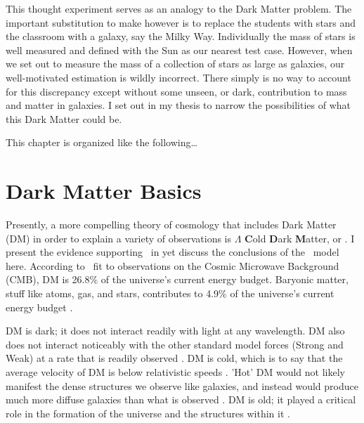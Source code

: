 This thought experiment serves as an analogy to the Dark Matter problem.
The important substitution to make however is to replace the students with stars and the classroom with a galaxy, say the Milky Way.
Individually the mass of stars is well measured and defined with the Sun as our nearest test case.
However, when we set out to measure the mass of a collection of stars as large as galaxies, our well-motivated estimation is wildly incorrect.
There simply is no way to account for this discrepancy except without some unseen, or dark, contribution to mass and matter in galaxies.
I set out in my thesis to narrow the possibilities of what this Dark Matter could be.

This chapter is organized like the following\dots
{}

\section{Dark Matter Basics\label{sec:basicDM}}

Presently, a more compelling theory of cosmology that includes Dark Matter (DM) in order to explain a variety of observations is $\Lambda$ \textbf{C}old \textbf{D}ark \textbf{M}atter, or \lcdm.
I present the evidence supporting \lcdm~in  yet discuss the conclusions of the \lcdm~model here.
According to \lcdm~fit to observations on the Cosmic Microwave Background (CMB), DM is 26.8\% of the universe's current energy budget.
Baryonic matter, stuff like atoms, gas, and stars, contributes to 4.9\% of the universe's current energy budget \cite{Greene:cosmology_dm,Young:cosmology_dm,Bertone:particleDM}.


DM is dark; it does not interact readily with light at any wavelength.
DM also does not interact noticeably with the other standard model forces (Strong and Weak) at a rate that is readily observed \cite{Bertone:particleDM}.
DM is cold, which is to say that the average velocity of DM is below relativistic speeds \cite{Greene:cosmology_dm}.
'Hot' DM would not likely manifest the dense structures we observe like galaxies, and instead would produce much more diffuse galaxies than what is observed \cite{Bertone:particleDM,Greene:cosmology_dm}.
DM is old; it played a critical role in the formation of the universe and the structures within it \cite{Greene:cosmology_dm,Young:cosmology_dm}.

